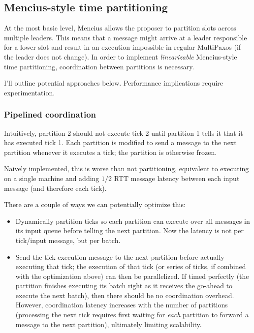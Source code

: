 \documentclass{article}
\begin{document}
\subsection{Mencius-style time partitioning}
At the most basic level, Mencius allows the proposer to partition slots across multiple leaders.
This means that a message might arrive at a leader responsible for a lower slot and result in an execution impossible in regular MultiPaxos (if the leader does not change).
In order to implement \emph{linearizable} Mencius-style time partitioning, coordination between partitions is necessary.

I'll outline potential approaches below.
Performance implications require experimentation.

\subsubsection{Pipelined coordination}
Intuitively, partition 2 should not execute tick 2 until partition 1 tells it that it has executed tick 1.
Each partition is modified to send a message to the next partition whenever it executes a tick; the partition is otherwise frozen.

Naively implemented, this is worse than not partitioning, equivalent to executing on a single machine and adding $1/2$ RTT message latency between each input message (and therefore each tick).

There are a couple of ways we can potentially optimize this:
\begin{itemize}
  \item Dynamically partition ticks so each partition can execute over all messages in its input queue before telling the next partition.
    Now the latency is not per tick/input message, but per batch.
  \item Send the tick execution message to the next partition before actually executing that tick; the execution of that tick (or series of ticks, if combined with the optimization above) can then be parallelized.
    If timed perfectly (the partition finishes executing its batch right as it receives the go-ahead to execute the next batch), then there should be no coordination overhead.
    However, coordination latency increases with the number of partitions (processing the next tick requires first waiting for \emph{each} partition to forward a message to the next partition), ultimately limiting scalability.
\end{itemize}
\end{document}
